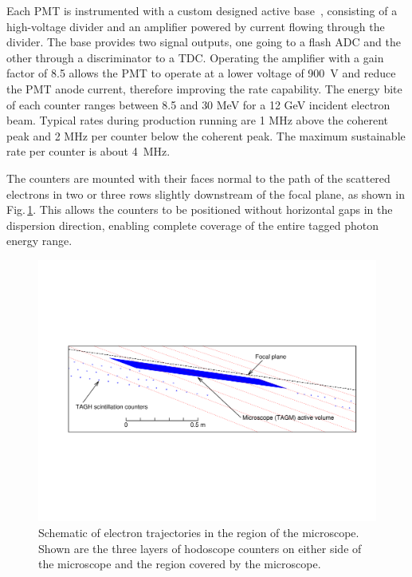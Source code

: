 Each PMT is instrumented with a custom designed active base~\cite{tagh:base},
consisting of a high-voltage divider and an amplifier powered by current
flowing through the divider. The base provides two signal outputs, one going
to a flash ADC and the other through a discriminator to a TDC.
Operating the amplifier with a gain factor of 8.5 allows the PMT to operate at a
lower voltage of 900~V and reduce the PMT anode current, therefore improving
the rate capability. The energy bite of each counter ranges between 8.5 and
30 MeV for a 12 GeV incident electron beam.  Typical rates during production
running are 1 MHz above the coherent peak and 2 MHz per counter below the
coherent peak. The maximum sustainable rate per counter is about 4~MHz.

The counters are mounted with their faces normal to the path of the
scattered electrons in two or three rows slightly downstream of the focal
plane, as shown in Fig.\,\ref{fig:beam:BEAM_taggerdetectors}.
This allows the counters to be positioned without horizontal gaps in
the dispersion direction, enabling complete coverage of the entire
tagged photon energy range.

\begin{figure}[tbp]
\begin{center}
      \includegraphics[width=0.95\linewidth,viewport=80 200 750 400]{figures/BEAM_taggerdetectors.pdf}
\caption{Schematic of electron trajectories in the region of the microscope. Shown are the three layers of hodoscope counters on either side of the microscope and the 
               region covered by the microscope.
       \label{fig:beam:BEAM_taggerdetectors}  }

\end{center}
\end{figure}


